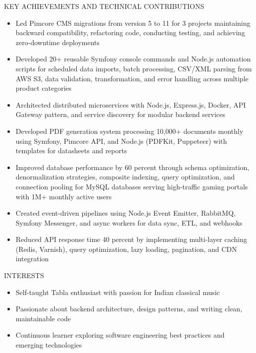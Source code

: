 \documentclass{resume} %
\begin{document}
\begin{rSection}{KEY ACHIEVEMENTS AND TECHNICAL CONTRIBUTIONS}
\begin{itemize}
    \item Led Pimcore CMS migrations from version 5 to 11 for 3 projects maintaining backward compatibility, refactoring code, conducting testing, and achieving zero-downtime deployments
    \item Developed 20+ reusable Symfony console commands and Node.js automation scripts for scheduled data imports, batch processing, CSV/XML parsing from AWS S3, data validation, transformation, and error handling across multiple product categories
    \item Architected distributed microservices with Node.js, Express.js, Docker, API Gateway pattern, and service discovery for modular backend services
    \item Developed PDF generation system processing 10,000+ documents monthly using Symfony, Pimcore API, and Node.js (PDFKit, Puppeteer) with templates for datasheets and reports
    \item Improved database performance by 60 percent through schema optimization, denormalization strategies, composite indexing, query optimization, and connection pooling for MySQL databases serving high-traffic gaming portals with 1M+ monthly active users
    \item Created event-driven pipelines using Node.js Event Emitter, RabbitMQ, Symfony Messenger, and async workers for data sync, ETL, and webhooks
    \item Reduced API response time 40 percent by implementing multi-layer caching (Redis, Varnish), query optimization, lazy loading, pagination, and CDN integration
\end{itemize}

\end{rSection}


\begin{rSection}{INTERESTS}
\begin{itemize}
    \item Self-taught Tabla enthusiast with passion for Indian classical music
    \item Passionate about backend architecture, design patterns, and writing clean, maintainable code
    \item Continuous learner exploring software engineering best practices and emerging technologies
\end{itemize}

\end{rSection}
\end{document}
